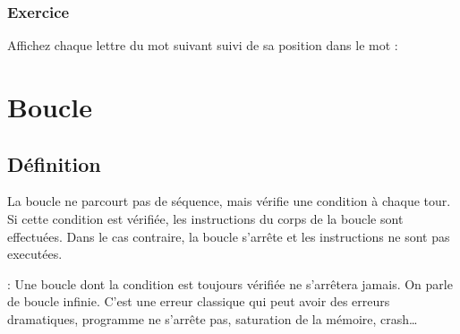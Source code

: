 \documentclass[letterpaper,10pt,english]{sphinxmanual}
\begin{document}
\subsubsection{Exercice}
\label{\detokenize{src/OCI04_Boucles:exercice}}
Affichez chaque lettre du mot suivant suivi de sa position dans le mot : 


\section{Boucle }
\label{\detokenize{src/OCI04_Boucles:boucle-while}}

\subsection{Définition}
\label{\detokenize{src/OCI04_Boucles:definition}}
La boucle  ne parcourt pas de séquence, mais vérifie une condition à chaque tour. Si cette condition est vérifiée, les instructions du corps de la boucle sont effectuées. Dans le cas contraire, la boucle s’arrête et les instructions ne sont pas executées.

\begin{sphinxVerbatim}[commandchars=\\\{\}]
  
   
     
      
\end{sphinxVerbatim}

 : Une boucle  dont la condition est toujours vérifiée ne s’arrêtera jamais. On parle de boucle infinie. C’est une erreur classique qui peut avoir des erreurs dramatiques, programme ne s’arrête pas, saturation de la mémoire, crash…

\begin{sphinxVerbatim}[commandchars=\\\{\}]
  
   
     
        
\end{sphinxVerbatim}
\end{document}
